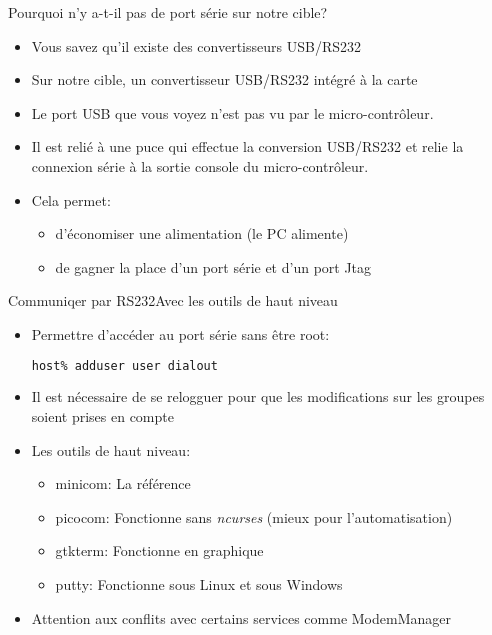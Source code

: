 \begin{frame}{Pourquoi n'y a-t-il pas de port série sur notre cible?}
  \begin{itemize}
  \item Vous savez qu'il existe des convertisseurs USB/RS232
  \item  Sur notre  cible, un  convertisseur USB/RS232  intégré  à la
    carte
  \item   Le  port  USB   que  vous   voyez  n'est   pas  vu   par  le
    micro-contrôleur.
  \item Il est  relié à une puce qui  effectue la conversion USB/RS232
    et   relie  la   connexion   série  à   la   sortie  console   du
    micro-contrôleur.
  \item Cela permet:
    \begin{itemize}
    \item d'économiser une alimentation (le PC alimente)
    \item  de  gagner la  place  d'un port  série  et  d'un port  Jtag
    \end{itemize}
  \end{itemize}
\end{frame}

\begin{frame}[fragile=singleslide]{Communiqer par RS232}{Avec les outils de haut niveau}
  \begin{itemize}
  \item Permettre d'accéder au port série sans être root:
\begin{lstlisting}[language=sh]
host% adduser user dialout
\end{lstlisting} %
  \item Il est nécessaire de se relogguer pour que les modifications sur les
    groupes soient prises en compte
  \item Les outils de haut niveau:
  \begin{itemize}
  \item minicom: La référence
  \item picocom:   Fonctionne   sans  \emph{ncurses}   (mieux   pour
    l'automatisation)
  \item gtkterm: Fonctionne en graphique
  \item putty: Fonctionne sous Linux et sous Windows
  \end{itemize}
  \item Attention aux conflits avec certains services comme ModemManager
  \end{itemize}
\end{frame}


